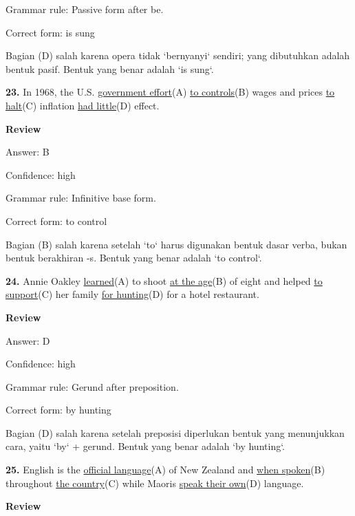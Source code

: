\documentclass[12pt]{article}
\begin{document}
Grammar rule: Passive form after be.\par
Correct form: is sung\par
Bagian (D) salah karena opera tidak `bernyanyi` sendiri; yang dibutuhkan adalah bentuk pasif. Bentuk yang benar adalah `is sung`.\par
\endgroup
\par
\vspace{\questionblockgap}
\noindent\textbf{23.} In 1968, the U.S. \uline{government effort}(A) \uline{to controls}(B) wages and prices \uline{to halt}(C) inflation \uline{had little}(D) effect.
\par
\begingroup
\setlength{\parskip}{0pt}
\setlength{\parindent}{0pt}
\textbf{Review}\par
Answer: B\par
Confidence: high\par
Grammar rule: Infinitive base form.\par
Correct form: to control\par
Bagian (B) salah karena setelah `to` harus digunakan bentuk dasar verba, bukan bentuk berakhiran -s. Bentuk yang benar adalah `to control`.\par
\endgroup
\par
\vspace{\questionblockgap}
\noindent\textbf{24.} Annie Oakley \uline{learned}(A) to shoot \uline{at the age}(B) of eight and helped \uline{to support}(C) her family \uline{for hunting}(D) for a hotel restaurant.
\par
\begingroup
\setlength{\parskip}{0pt}
\setlength{\parindent}{0pt}
\textbf{Review}\par
Answer: D\par
Confidence: high\par
Grammar rule: Gerund after preposition.\par
Correct form: by hunting\par
Bagian (D) salah karena setelah preposisi diperlukan bentuk yang menunjukkan cara, yaitu `by` + gerund. Bentuk yang benar adalah `by hunting`.\par
\endgroup
\par
\vspace{\questionblockgap}
\noindent\textbf{25.} English is the \uline{official language}(A) of New Zealand and \uline{when spoken}(B) throughout \uline{the country}(C) while Maoris \uline{speak their own}(D) language.
\par
\begingroup
\setlength{\parskip}{0pt}
\setlength{\parindent}{0pt}
\textbf{Review}\par
\end{document}
